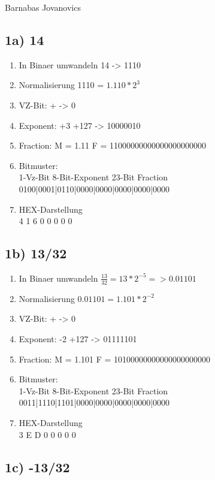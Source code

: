 \documentclass[]{article}
\date{}
\providecommand{\tightlist}{%
  \setlength{\itemsep}{0pt}\setlength{\parskip}{0pt}}
\begin{document}
Barnabas Jovanovics

\subsection{1a) 14}\label{a-14}

\begin{enumerate}
\tightlist
\item
  In Binaer umwandeln 14 -> 1110
\item
  Normalisierung 1110 = $1.110 * 2^{3}$
\item
  VZ-Bit: + -> 0
\item
  Exponent: +3 +127 -> 10000010
\item
  Fraction: M = 1.11 F = 11000000000000000000000
\item
  Bitmuster:\\
  1-Vz-Bit 8-Bit-Exponent 23-Bit Fraction\\
  0100|0001|0110|0000|0000|0000|0000|0000
\item
  HEX-Darstellung\\
  4 1 6 0 0 0 0 0
\end{enumerate}

\subsection{1b) 13/32}\label{b-1332}

\begin{enumerate}
\tightlist
\item
  In Binaer umwandeln $\frac{13}{32} = 13 * 2^{-5} => 0.01101$
\item
  Normalisierung $0.01101 = 1.101 * 2^{-2}$
\item
  VZ-Bit: + -> 0
\item
  Exponent: -2 +127 -> 01111101
\item
  Fraction: M = 1.101 F = 10100000000000000000000
\item
  Bitmuster:\\
  1-Vz-Bit 8-Bit-Exponent 23-Bit Fraction\\
  0011|1110|1101|0000|0000|0000|0000|0000
\item
  HEX-Darstellung\\
  3 E D 0 0 0 0 0
\end{enumerate}

\subsection{1c) -13/32}\label{c--1332}
\end{document}
